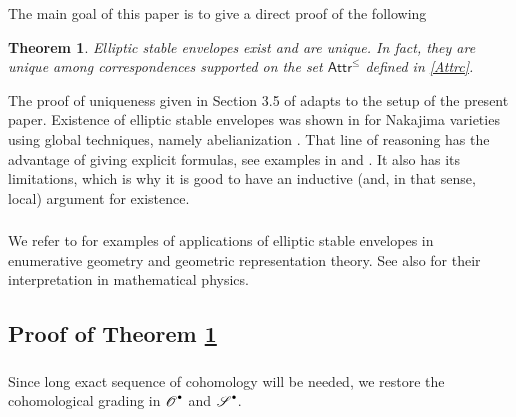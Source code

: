 \documentclass[14pt]{extarticle}
\newcommand{\cOd}{{\cO}^{\raisebox{0.5mm}{$\scriptscriptstyle \bullet$}}}
\newcommand{\cSd}{{\cS}^{\raisebox{0.5mm}{$\scriptscriptstyle \bullet$}}}
\newcommand{\cL}{\mathscr{L}}
\newcommand{\cS}{\mathscr{S}}
\newcommand{\cO}{\mathscr{O}}
\newcommand{\Attrc}{\Attr^{\le}}
\newcommand{\Attr}{\mathsf{Attr}}
\DeclareMathOperator{\rk}{rk}
\newtheorem{Theorem}{Theorem}
\theoremstyle{definition}
\begin{document}
The main goal of this paper is to give a direct proof of the following

\begin{Theorem}\label{t1} 
 Elliptic stable envelopes exist and are unique. In fact, they are
 unique among correspondences supported on the set
 $\Attrc$ defined in \eqref{Attrc}. 
\end{Theorem}

The proof of
uniqueness given in
Section 3.5 of \cite{ese} adapts to the setup of the present
paper. Existence of elliptic stable envelopes was shown in \cite{ese} for
Nakajima varieties using global techniques, namely abelianization
\cite{Shen}.
That line of reasoning has
the advantage of giving explicit formulas, see examples in \cite{ese}
and \cite{SmirHilb}. It also has its
limitations, which is why it is good to have an inductive (and, in that
sense, local) argument for existence. 

\subsubsection{}

We refer to \cite{ese} for examples of applications of elliptic stable
envelopes in enumerative geometry and geometric representation
theory. See also \cite{AO2} for their interpretation in mathematical
physics. 





\subsection{Proof of Theorem \ref{t1}} \label{s_proof1}


\subsubsection{}

Since long exact sequence of cohomology will be needed, we restore the
cohomological grading in $\cOd$ and $\cSd$. 
\end{document}
